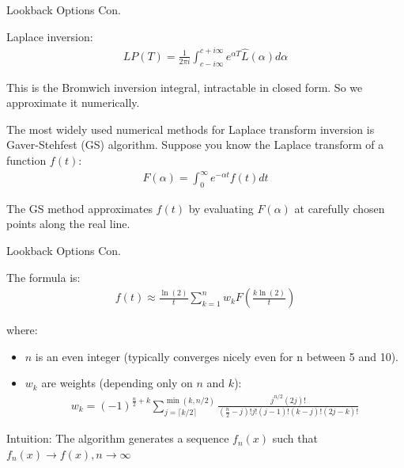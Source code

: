\documentclass{beamer}
\begin{document}
\begin{frame}{Lookback Options Con.}


    {\footnotesize \footnotesize
    \par Laplace inversion: 
    \begin{align*}
        LP(T)  = \frac{1}{2\pi i} 
        \int_{c-i\infty}^{c+i\infty} e^{\alpha T} \hat{L}(\alpha)  d\alpha
    \end{align*}
    \par This is the Bromwich inversion integral, intractable in closed form.
     So we approximate it numerically. 
     \par The most widely used numerical methods for Laplace transform inversion is
     Gaver-Stehfest (GS) algorithm. Suppose you know the Laplace transform of a function \( f(t) \):
     \begin{align*}
        F(\alpha) = \int_{0}^{\infty} e^{-\alpha t} f(t)  dt
     \end{align*}
     \par The GS method approximates \( f(t) \) by evaluating \( F(\alpha) \) at carefully 
     chosen points along the real line.

    }
    
\end{frame}

\begin{frame}{Lookback Options Con.}


    {\footnotesize \footnotesize
    \par The formula is:
    \begin{align*}
        f(t) \approx \frac{\ln(2)}{t} \sum_{k=1}^{n} w_k F \left( \frac{k \ln(2)}{t} \right)
    \end{align*}

where:

\begin{itemize}
    \item \( n \) is an even integer (typically converges nicely even for n between 5 and 10).
    \item \( w_k \) are weights (depending only on \( n \) and \( k \)):
    \begin{align*}
        w_k = (-1)^{\frac{n}{2}+k} \sum_{j=\lceil k/2 \rceil}^{\min(k,n/2)} 
        \frac{j^{n/2}(2j)!}{(\frac{n}{2}-j)! j! (j-1)! (k-j)! (2j-k)!}
    \end{align*}
\end{itemize}
\par Intuition: The algorithm generates a sequence \( f_n(x) \) such that \( f_n(x) \to f(x),  n \to \infty \)

    }
    
\end{frame}
\end{document}
